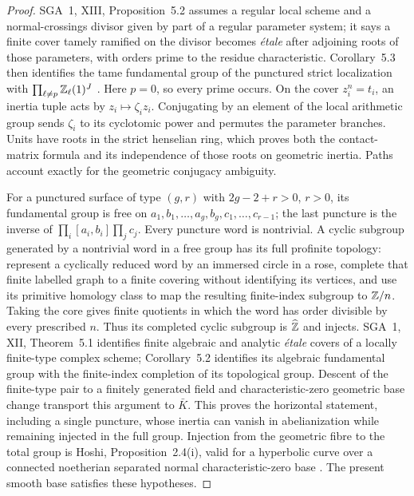 \begin{proof}
SGA~1, XIII, Proposition~5.2 assumes a regular local scheme and a
normal-crossings divisor given by part of a regular parameter system;
it says a finite cover tamely ramified on the divisor becomes
\emph{\'etale} after adjoining roots of those parameters, with orders
prime to the residue characteristic. Corollary~5.3 then identifies
the tame fundamental group of the punctured strict localization with
$\prod_{\ell\ne p}\mathbb Z_\ell(1)^J$ \citep{F_SGA1}. Here $p=0$,
so every prime occurs. On the cover $z_i^n=t_i$, an inertia tuple
acts by $z_i\mapsto\zeta_i z_i$. Conjugating by an element of the
local arithmetic group sends $\zeta_i$ to its cyclotomic power and
permutes the parameter branches. Units have roots in the strict
henselian ring, which proves both the contact-matrix formula and
its independence of those roots on geometric inertia. Paths account
exactly for the geometric conjugacy ambiguity.

For a punctured surface of type $(g,r)$ with
$2g-2+r>0$, $r>0$, its fundamental group is free on
$a_1,b_1,\ldots,a_g,b_g,c_1,\ldots,c_{r-1}$; the last puncture is
the inverse of $\prod_i[a_i,b_i]\prod_j c_j$. Every puncture word
is nontrivial. A cyclic subgroup generated by a nontrivial word in
a free group has its full profinite topology: represent a cyclically
reduced word by an immersed circle in a rose, complete that finite
labelled graph to a finite covering without identifying its vertices,
and use its primitive homology class to map the resulting finite-index
subgroup to $\mathbb Z/n$. Taking the core gives finite quotients in which
the word has order divisible by every prescribed $n$. Thus its
completed cyclic subgroup is $\widehat{\mathbb Z}$ and injects.
SGA~1, XII, Theorem~5.1 identifies finite algebraic and analytic
\emph{\'etale} covers of a locally finite-type complex scheme;
Corollary~5.2 identifies its algebraic fundamental group with the
finite-index completion of its topological group. Descent of the
finite-type pair to a finitely generated field and characteristic-zero
geometric base change transport this argument to $\bar K$.
This proves the horizontal statement, including a single puncture,
whose inertia can vanish in abelianization while remaining injected
in the full group. Injection from the geometric fibre to the total
group is Hoshi, Proposition~2.4(i), valid for a hyperbolic curve
over a connected noetherian separated normal characteristic-zero
base \citep{F_Hoshi2014}. The present smooth base satisfies these
hypotheses.


\end{proof}
